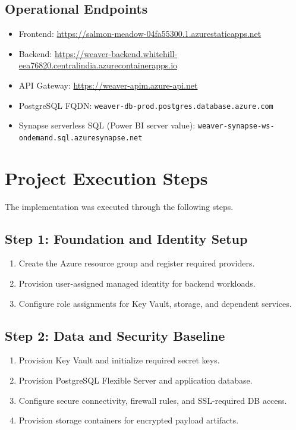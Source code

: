 \documentclass[12pt,a4paper]{article}
\begin{document}
\subsection*{Operational Endpoints}

\begin{itemize}[leftmargin=1.4em]
  \item Frontend: \url{https://salmon-meadow-04fa55300.1.azurestaticapps.net}
  \item Backend: \url{https://weaver-backend.whitehill-eea76820.centralindia.azurecontainerapps.io}
  \item API Gateway: \url{https://weaver-apim.azure-api.net}
  \item PostgreSQL FQDN: \texttt{weaver-db-prod.postgres.database.azure.com}
  \item Synapse serverless SQL (Power BI server value): \texttt{weaver-synapse-ws-ondemand.sql.azuresynapse.net}
\end{itemize}

\section{Project Execution Steps}

The implementation was executed through the following steps.

\subsection{Step 1: Foundation and Identity Setup}

\begin{enumerate}[leftmargin=1.4em]
  \item Create the Azure resource group and register required providers.
  \item Provision user-assigned managed identity for backend workloads.
  \item Configure role assignments for Key Vault, storage, and dependent services.
\end{enumerate}

\subsection{Step 2: Data and Security Baseline}

\begin{enumerate}[leftmargin=1.4em]
  \item Provision Key Vault and initialize required secret keys.
  \item Provision PostgreSQL Flexible Server and application database.
  \item Configure secure connectivity, firewall rules, and SSL-required DB access.
  \item Provision storage containers for encrypted payload artifacts.
\end{enumerate}
\end{document}

